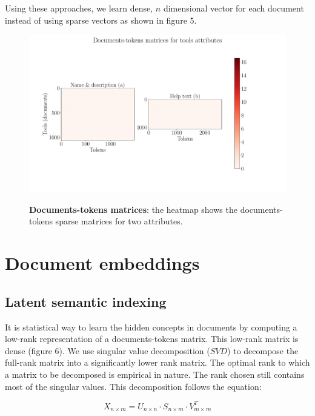 Using these approaches, we learn dense, $n$ dimensional vector for each document instead of using sparse vectors as shown in figure 5. 

\begin{figure}[h]
\begin{centering}
    {\includegraphics[scale=0.4]{figures/Document_tokens_full_rank.pdf}}
    \caption[Documents-tokens matrices]{\textbf{Documents-tokens matrices}: the heatmap shows the documents-tokens sparse matrices for two attributes.}
\end{centering}
\end{figure}

    
\section{Document embeddings}
\subsection{Latent semantic indexing}
    It is statistical way to learn the hidden concepts in documents by computing a low-rank representation of a documents-tokens matrix. This low-rank matrix is dense (figure 6). We use singular value decomposition ($SVD$) to decompose the full-rank matrix into a significantly lower rank matrix. The optimal rank to which a matrix to be decomposed is empirical in nature. The rank chosen still contains most of the singular values. This decomposition follows the equation:
    
    \begin{equation}
    X_{n \times m} = U_{n \times n} \cdot S_{n \times m} \cdot V_{m \times m}^T
    \end{equation}
    

